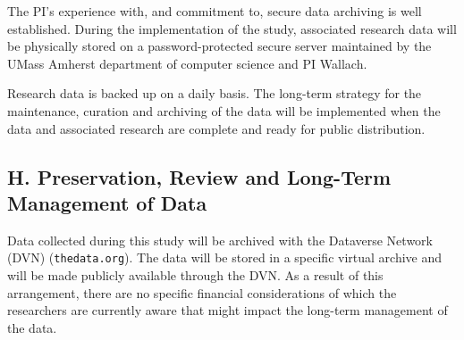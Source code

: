The PI's experience with, and commitment to, secure data archiving is well established. During the implementation of the
study, associated research data will be physically stored on a password-protected secure server
maintained by the UMass Amherst department of computer science and PI Wallach. %

Research data is backed up on a daily basis. The long-term strategy for the maintenance, curation and archiving of
the data will be implemented when the data and associated research are complete and ready for public distribution. 

\subsection*{H. Preservation, Review and Long-Term Management of Data }
Data collected during this study will be archived with the Dataverse Network (DVN) (\texttt{thedata.org}). The data will be
stored in a specific virtual archive and will be made publicly available through the DVN.
As a result of this arrangement, there are no specific financial considerations of which the researchers
are currently aware that might impact the long-term management of the data. 








